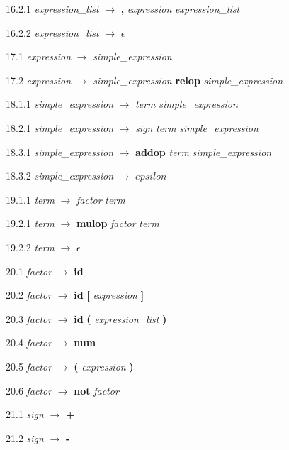 16.2.1 \emph{expression\_list\textprime} $\rightarrow$ \textbf{,} \emph{expression} \emph{expression\_list\textprime}

16.2.2 \emph{expression\_list\textprime} $\rightarrow$ $\epsilon$

17.1 \emph{expression} $\rightarrow$ \emph{simple\_expression}

17.2 \emph{expression} $\rightarrow$ \emph{simple\_expression} \textbf{relop} \emph{simple\_expression}

18.1.1 \emph{simple\_expression} $\rightarrow$ \emph{term} \emph{simple\_expression\textprime}

18.2.1 \emph{simple\_expression} $\rightarrow$ \emph{sign} \emph{term} \emph{simple\_expression\textprime}

18.3.1 \emph{simple\_expression\textprime} $\rightarrow$ \textbf{addop} \emph{term} \emph{simple\_expression\textprime}

18.3.2 \emph{simple\_expression\textprime} $\rightarrow$ $epsilon$

19.1.1 \emph{term} $\rightarrow$ \emph{factor} \emph{term\textprime}

19.2.1 \emph{term\textprime} $\rightarrow$ \textbf{mulop} \emph{factor} \emph{term\textprime}

19.2.2 \emph{term\textprime} $\rightarrow$ $\epsilon$

20.1 \emph{factor} $\rightarrow$ \textbf{id}

20.2 \emph{factor} $\rightarrow$ \textbf{id} \textbf{[} \emph{expression} \textbf{]}

20.3 \emph{factor} $\rightarrow$ \textbf{id} \textbf{(} \emph{expression\_list} \textbf{)}

20.4 \emph{factor} $\rightarrow$ \textbf{num}

20.5 \emph{factor} $\rightarrow$ \textbf{(} \emph{expression} \textbf{)}

20.6 \emph{factor} $\rightarrow$ \textbf{not} \emph{factor}

21.1 \emph{sign} $\rightarrow$ \textbf{+}

21.2 \emph{sign} $\rightarrow$ \textbf{-}
%